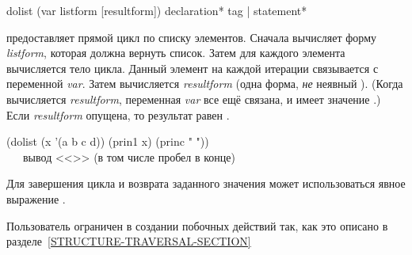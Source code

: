 \begin{defmac}
dolist (var listform [resultform])
       {declaration}* {tag | statement}*

 предоставляет прямой цикл по списку элементов.
Сначала 
вычисляет форму \emph{listform}, которая должна вернуть список.
Затем для каждого элемента вычисляется тело цикла. Данный элемент на каждой
итерации связывается с переменной \emph{var}.
Затем вычисляется \emph{resultform} (одна форма, \emph{не} неявный ).
(Когда вычисляется \emph{resultform}, переменная \emph{var} все ещё связана, и
имеет значение {\nil}.)
Если \emph{resultform} опущена, то результат равен {\false}.
\begin{lisp}
(dolist (x '(a b c d)) (prin1 x) (princ " ")) \EV\ {\false} \\
~~~\textrm{вывод <<>> (в том числе пробел в конце)}
\end{lisp}
Для завершения цикла и возврата заданного значения может использоваться явное
выражение .

Пользователь ограничен в создании побочных действий так, как это описано в
разделе~\ref{STRUCTURE-TRAVERSAL-SECTION}
\end{defmac}

